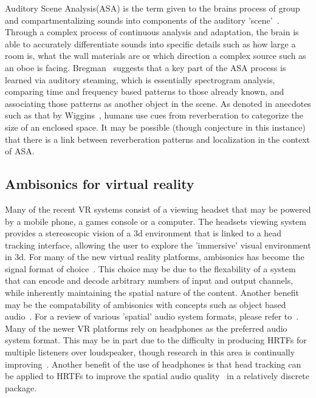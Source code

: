 \documentclass[paper=a4, fontsize=10pt, font=arial]{scrartcl} %
\numberwithin{equation}{section} %
\numberwithin{figure}{section} %
\numberwithin{table}{section} %
\begin{document}
Auditory Scene Analysis(ASA) is the term given to the brains process of group and compartmentalizing sounds into components of the auditory 'scene'~\cite{rumsey2012spatial}. Through a complex process of continuous analysis and adaptation, the brain is able to accurately differentiate sounds into specific details such as how large a room is, what the wall materials are or which direction a complex source such as an oboe is facing. Bregman~\cite{Bregman1994} suggests that a key part of the ASA process is learned via auditory steaming, which is essentially spectrogram analysis, comparing time and frequency based patterns to those already known, and associating those patterns as another object in the scene. As denoted in anecdotes such as that by Wiggins~\cite{Wiggins2004}, humans use cues from reverberation to categorize the size of an enclosed space. It may be possible (though conjecture in this instance) that there is a link between reverberation patterns and localization in the context of ASA.

\subsection{Ambisonics for virtual reality}

Many of the recent VR systems consist of a viewing headset that may be powered by a mobile phone, a games console or a computer. The headsets viewing system provides a stereoscopic vision of a 3d environment that is linked to a head tracking interface, allowing the user to explore the 'immersive' visual environment in 3d. For many of the new virtual reality platforms, ambisonics has become the signal format of choice~\cite{googlevr2016}. This choice may be due to the flexability of a system that can encode and decode arbitrary numbers of input and output channels, while inherently maintaining the spatial nature of the content.
Another benefit may be the compatability of ambisonics with concepts such as object based audio~\cite{Pike2016}. For a review of various 'spatial' audio system formats, please refer to~\cite{Wiggins2004}. Many of the newer VR platforms rely on headphones as the preferred audio system format. This may be in part due to the difficulty in producing HRTFs for multiple listeners over loudspeaker, though research in this area is continually improving~\cite{Galvez2016}. Another benefit of the use of headphones is that head tracking can be applied to HRTFs to improve the spatial audio quality~\cite{Inanaga1995} in a relatively discrete package.\\
\end{document}
